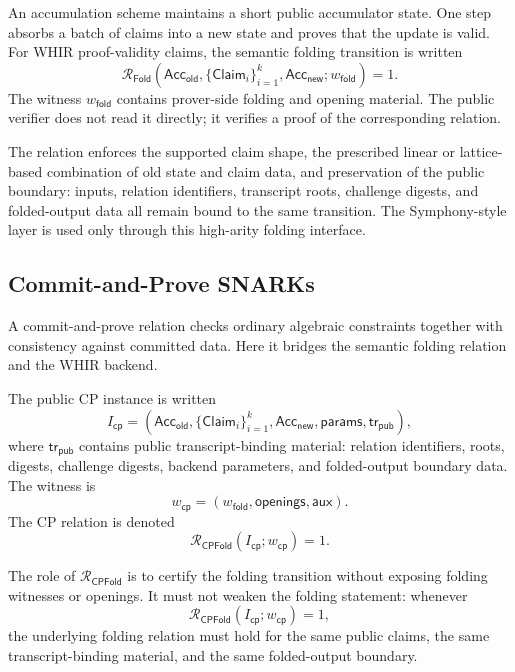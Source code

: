 \documentclass[11pt]{article}
\theoremstyle{definition}
\newcommand{\Acc}{\mathsf{Acc}}
\newcommand{\Rfold}{\mathcal{R}_{\mathsf{Fold}}}
\newcommand{\Rcp}{\mathcal{R}_{\mathsf{CPFold}}}
\begin{document}
An accumulation scheme maintains a short public accumulator state. One step
absorbs a batch of claims into a new state and proves that the update is valid.
For WHIR proof-validity claims, the semantic folding transition is written
\[
  \Rfold\!\left(
    \Acc_{\mathsf{old}},
    \{\mathsf{Claim}_i\}_{i=1}^k,
    \Acc_{\mathsf{new}};
    w_{\mathsf{fold}}
  \right)=1.
\]
The witness \(w_{\mathsf{fold}}\) contains prover-side folding and opening
material. The public verifier does not read it directly; it verifies a proof of
the corresponding relation.

The relation enforces the supported claim shape, the prescribed linear or
lattice-based combination of old state and claim data, and preservation of the
public boundary: inputs, relation identifiers, transcript roots, challenge
digests, and folded-output data all remain bound to the same transition. The
Symphony-style layer is used only through this high-arity folding interface.

\subsection{Commit-and-Prove SNARKs}
\label{sec:prelim-cp-snarks}

A commit-and-prove relation checks ordinary algebraic constraints together with
consistency against committed data. Here it bridges the semantic folding
relation and the WHIR backend.

The public CP instance is written
\[
  I_{\mathsf{cp}}
  =
  \left(
    \Acc_{\mathsf{old}},
    \{\mathsf{Claim}_i\}_{i=1}^k,
    \Acc_{\mathsf{new}},
    \mathsf{params},
    \mathsf{tr}_{\mathsf{pub}}
  \right),
\]
where \(\mathsf{tr}_{\mathsf{pub}}\) contains public transcript-binding
material: relation identifiers, roots, digests, challenge digests, backend
parameters, and folded-output boundary data. The witness is
\[
  w_{\mathsf{cp}}
  =
  \left(
    w_{\mathsf{fold}},
    \mathsf{openings},
    \mathsf{aux}
  \right).
\]
The CP relation is denoted
\[
  \Rcp(I_{\mathsf{cp}};w_{\mathsf{cp}})=1.
\]

The role of \(\Rcp\) is to certify the folding transition without exposing
folding witnesses or openings. It must not weaken the folding statement: whenever
\[
  \Rcp(I_{\mathsf{cp}};w_{\mathsf{cp}})=1,
\]
the underlying folding relation must hold for the same public claims, the same
transcript-binding material, and the same folded-output boundary.
\end{document}
